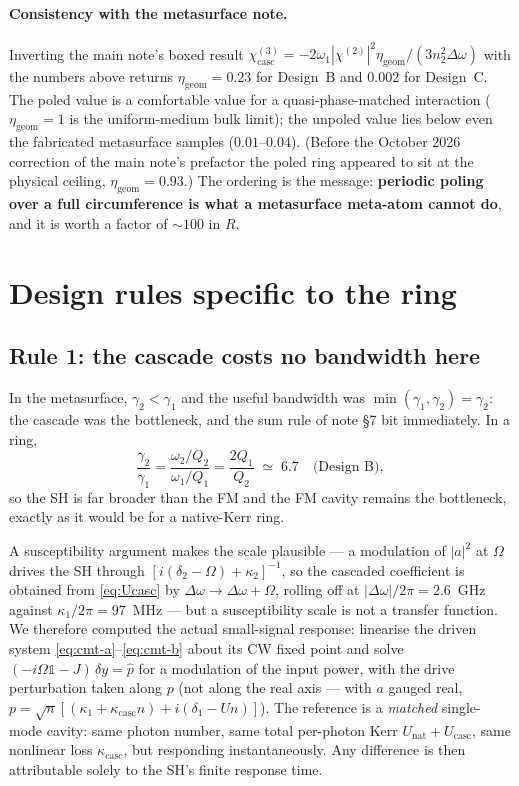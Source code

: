 \documentclass[11pt,a4paper]{article}
\newcommand{\chitwo}{\chi^{(2)}}
\newcommand{\chithree}{\chi^{(3)}}
\newcommand{\Dom}{\Delta\omega}
\newcommand{\Ucasc}{U_{\text{casc}}}
\newcommand{\Unat}{U_{\text{nat}}}
\newcommand{\kcasc}{\kappa_{\text{casc}}}
\begin{document}
\paragraph{Consistency with the metasurface note.}  Inverting the main
note's boxed result
$\chithree_{\text{casc}}=-2\omega_1|\chitwo|^2\eta_{\text{geom}}/(3n_2^2\Dom)$
with the numbers above returns $\eta_{\text{geom}}=0.23$ for Design~B
and $0.002$ for Design~C.  The poled value is a comfortable value for a
quasi-phase-matched interaction ($\eta_\text{geom}=1$ is the
uniform-medium bulk limit); the unpoled value lies below even the
fabricated metasurface samples ($0.01$--$0.04$).  (Before the October
2026 correction of the main note's prefactor the poled ring appeared to
sit at the physical ceiling, $\eta_{\text{geom}}=0.93$.)  The ordering is the
message: \textbf{periodic poling over a full circumference is what a
metasurface meta-atom cannot do}, and it is worth a factor of $\sim100$
in $R$.

\section{Design rules specific to the ring}\label{sec:rules}

\subsection{Rule 1: the cascade costs no bandwidth here}\label{sec:rule1}

In the metasurface, $\gamma_2<\gamma_1$ and the useful bandwidth was
$\min(\gamma_1,\gamma_2)=\gamma_2$: the cascade was the bottleneck, and
the sum rule of note \S7 bit immediately.  In a ring,
\begin{equation}
  \frac{\gamma_2}{\gamma_1}=\frac{\omega_2/Q_2}{\omega_1/Q_1}
     =\frac{2Q_1}{Q_2}\;\simeq\;6.7\quad\text{(Design B)} ,
\end{equation}
so the SH is far broader than the FM and the FM cavity remains the
bottleneck, exactly as it would be for a native-Kerr ring.

A susceptibility argument makes the scale plausible --- a modulation of
$|a|^2$ at $\Omega$ drives the SH through
$[i(\delta_2-\Omega)+\kappa_2]^{-1}$, so the cascaded coefficient is
obtained from \eqref{eq:Ucasc} by $\Dom\to\Dom+\Omega$, rolling off at
$|\Dom|/2\pi=2.6$~GHz against $\kappa_1/2\pi=97$~MHz --- but a
susceptibility scale is not a transfer function.  We therefore computed
the actual small-signal response: linearise the driven system
\eqref{eq:cmt-a}--\eqref{eq:cmt-b} about its CW fixed point and solve
$(-i\Omega\mathbb{1}-J)\,\delta y=\hat p$ for a modulation of the input
power, with the drive perturbation taken along $p$ (not along the real
axis --- with $a$ gauged real, $p=\sqrt n[(\kappa_1+\kcasc n)
+i(\delta_1-Un)]$).  The reference is a \emph{matched} single-mode
cavity: same photon number, same total per-photon Kerr
$\Unat+\Ucasc$, same nonlinear loss $\kcasc$, but responding
instantaneously.  Any difference is then attributable solely to the
SH's finite response time.
\end{document}
